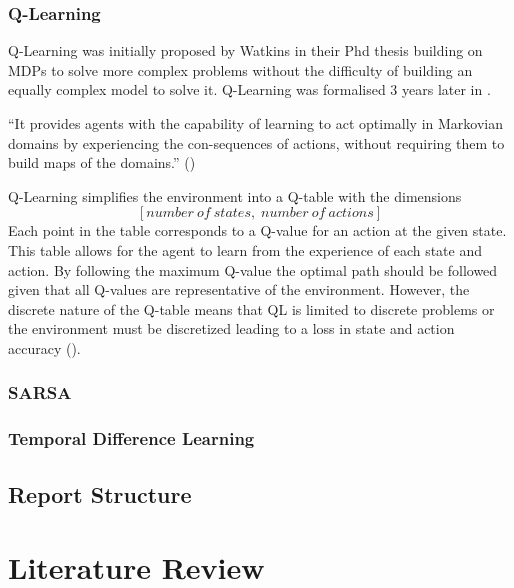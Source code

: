 \documentclass[10pt,journal]{IEEEtran}
\begin{document}
\subsubsection{Q-Learning}
Q-Learning was initially proposed by Watkins in their Phd thesis \cite{Watkins89} building on MDPs to solve more complex problems without the difficulty of building an equally complex model to solve it. Q-Learning was formalised 3 years later in \cite{Watkins92}.

“It provides  agents with the capability of learning to act optimally in Markovian domains by experiencing the con-sequences of actions, without requiring them to build maps of the domains.” (\cite[55]{Watkins92})

Q-Learning simplifies the environment into a Q-table with the dimensions $$[number \: of \: states, \; number \: of \: actions]$$ Each point in the table corresponds to a Q-value for an action at the given state. This table allows for the agent to learn from the experience of each state and action. By following the maximum Q-value the optimal path should be followed given that all Q-values are representative of the environment. However, the discrete nature of the Q-table means that QL is limited to discrete problems or the environment must be discretized leading to a loss in state and action accuracy (\cite{Gaskett}). 

\subsubsection{SARSA}

\subsubsection{Temporal Difference Learning}

\subsection{Report Structure}

\tableofcontents{}

\section{Literature Review}
\end{document}
